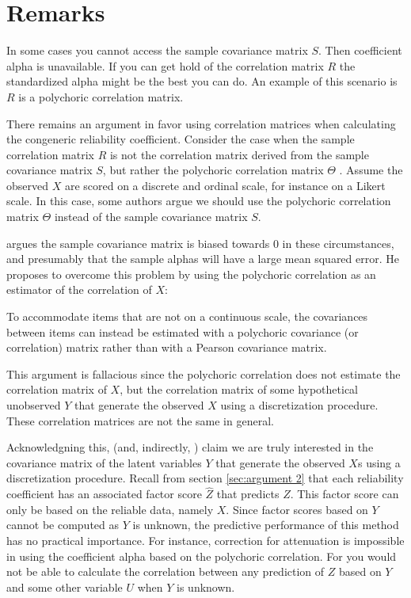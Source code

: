 \documentclass{article}
\theoremstyle{plain}
\theoremstyle{plain}
\theoremstyle{definition}
\theoremstyle{remark}
\theoremstyle{definition}
\theoremstyle{plain}
\theoremstyle{plain}
\theoremstyle{definition}
\begin{document}
\section{Remarks}
In some cases you cannot access the sample covariance matrix $S$. Then coefficient alpha is unavailable. If you can get hold of the correlation matrix $R$ the standardized alpha might be the best you can do. An example of this scenario is $R$ is a polychoric correlation matrix.

There remains an argument in favor using correlation matrices when calculating the congeneric reliability coefficient. Consider the case when the sample correlation matrix $R$ is not the correlation matrix derived from the sample covariance matrix $S$, but rather the polychoric correlation matrix $\Theta$ \citep{Olsson1979-ti}. Assume the observed $X$ are scored on a discrete and ordinal scale, for instance on a Likert scale. In this case, some authors argue we should use the polychoric correlation matrix $\Theta$ instead of the sample covariance matrix $S$. 

\citet[][p. 415]{McNeish2018-vu} argues the sample covariance matrix is biased towards $0$ in these circumstances, and presumably that the sample alphas will have a large mean squared error. He proposes to overcome this problem by using the polychoric correlation as an estimator of the correlation of $X$:

\begin{displayquote}To accommodate items that are not on a continuous scale, the
covariances between items can instead be estimated with a polychoric covariance (or correlation) matrix rather than with a Pearson covariance matrix.
\end{displayquote}

This argument is fallacious since the polychoric correlation does not estimate the correlation matrix of $X$, but the correlation matrix of some hypothetical unobserved $Y$ that generate the observed $X$ using a discretization procedure. These correlation matrices are not the same in general. 

Acknowledgning this, \citet[][p.2]{Gadermann2012-jl} (and, indirectly, \citet{Zumbo2007-ap}) claim we are truly interested in the covariance matrix of the latent variables $Y$ that generate the observed $X$s using a discretization procedure. Recall from section \ref{sec:argument 2} that each reliability coefficient has an associated factor score $\widehat{Z}$ that predicts $Z$. This factor score can only be based on the reliable data, namely $X$. Since factor scores based on $Y$ cannot be computed as $Y$ is unknown, the predictive performance of this method has no practical importance. For instance, correction for attenuation is impossible in using the coefficient alpha based on the polychoric correlation. For you would not be able to calculate the correlation between any prediction of $Z$ based on $Y$ and some other variable $U$ when $Y$ is unknown.
\end{document}

